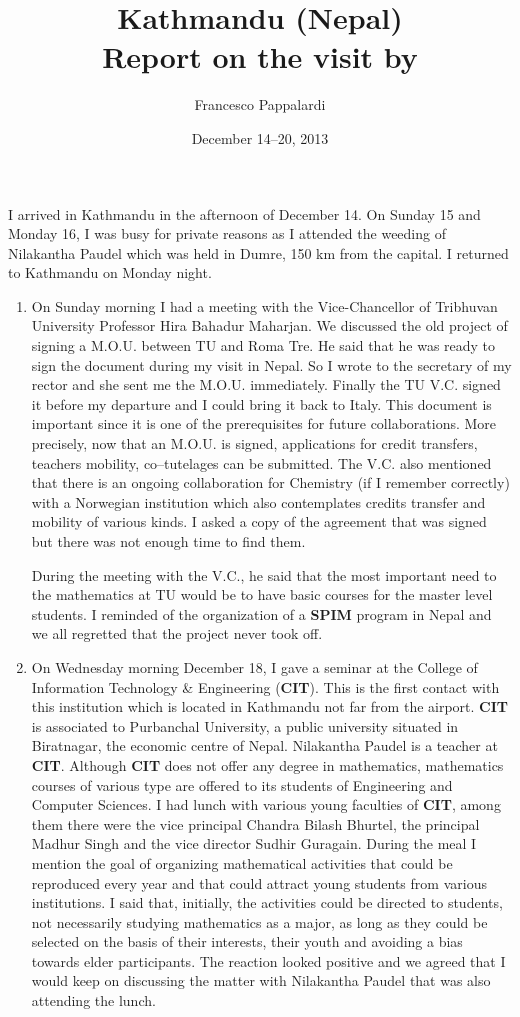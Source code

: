 \documentclass[12pt]{scrartcl}
\title{Kathmandu (Nepal)\\ Report on the visit by}
\author{Francesco Pappalardi}
\date{December 14--20, 2013}
\begin{document}
\maketitle

I arrived in Kathmandu in the afternoon of December 14. On Sunday 15 and Monday 16, I was busy for private reasons as 
I attended the weeding of Nilakantha Paudel which was held in Dumre, 150 km from the capital. I returned to Kathmandu on Monday night.

\begin{enumerate}
\item On Sunday morning I had a meeting with the Vice-Chancellor of Tribhuvan University Professor Hira Bahadur Maharjan. 
We discussed the old project of signing a M.O.U. between TU and Roma Tre. He said that he was ready to sign the document during my visit in Nepal. 
So I wrote to the secretary of my rector and she sent me the M.O.U. immediately. Finally the TU V.C. signed it before my departure and I could bring 
it back to Italy. This document is important since it is one of the prerequisites for future collaborations. More precisely, now that an M.O.U. 
is signed, applications for credit transfers, teachers mobility, co--tutelages can be submitted. The V.C. also mentioned that there is an ongoing 
collaboration for Chemistry (if I remember correctly) with a Norwegian institution which also contemplates credits transfer and mobility 
of various kinds. I asked a copy of the agreement that was signed but there was not enough time to find them.

During the meeting with the V.C., he said that the most important need to the mathematics at TU would be to have basic courses for the master 
level students. I reminded of the organization of a \textbf{SPIM} program in Nepal and we all regretted that the project never took off.

\item On Wednesday morning December 18, I gave a seminar at the College of Information Technology \& Engineering (\textbf{CIT}). This is the first contact with 
this institution which is located in Kathmandu not far from the airport. \textbf{CIT} is associated to Purbanchal University, a public university situated in 
Biratnagar, the economic centre of Nepal. Nilakantha Paudel is a teacher at \textbf{CIT}. Although \textbf{CIT} does not offer any degree in mathematics, mathematics courses of various 
type are offered to its students of Engineering and Computer Sciences. I had lunch with various young faculties of \textbf{CIT}, among them there were the vice principal 
Chandra Bilash Bhurtel, the principal Madhur Singh and the vice director Sudhir Guragain. During the meal I mention the goal of organizing 
mathematical activities 
that could be reproduced every year and that could attract young students from various institutions. 
I said that, initially, the activities could be directed to students, 
not necessarily studying mathematics as a major, as long as they 
could be selected on the basis of their interests, their youth and avoiding a bias towards elder participants. The reaction looked 
positive and we agreed that I would keep on discussing the matter with Nilakantha Paudel that was also attending the lunch.


\end{enumerate}
\end{document}
